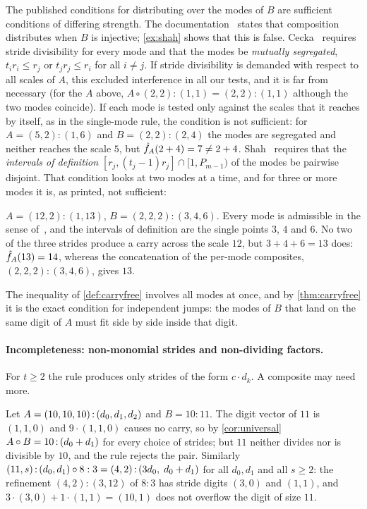 \noindent The published conditions for distributing over the modes of $B$ are sufficient
conditions of differing strength. The documentation~\cite{cutedocs} states that composition
distributes when $B$ is injective; \cref{ex:shah} shows that this is false. Cecka~\cite{cecka2026}
requires stride divisibility for every mode and that the modes be \emph{mutually segregated},
$t_ir_i\le r_j$ or $t_jr_j\le r_i$ for all $i\neq j$. If stride divisibility is demanded with
respect to all scales of $A$, this excluded interference in all our tests, and it is far from
necessary (for the $A$ above, $A\circ(2,2):(1,1)=(2,2):(1,1)$ although the two modes coincide).
If each mode is tested only against the scales that it reaches by itself, as in the single-mode
rule, the condition is not sufficient: for $A=(5,2):(1,6)$ and $B=(2,2):(2,4)$ the modes are
segregated and neither reaches the scale $5$, but $\hat{f}_{A}(2+4)=7\neq2+4$.
Shah~\cite[Def.~2.17, Thm.~2.18]{shah2024} requires that the \emph{intervals of definition}
$[r_j,(t_j-1)r_j]\cap[1,P_{m-1})$ of the modes be pairwise disjoint. That condition looks at two
modes at a time, and for three or more modes it is, as printed, not sufficient:

\begin{example}\label{ex:three}
$A=(12,2):(1,13)$, $B=(2,2,2):(3,4,6)$. Every mode is admissible in the sense
of~\cite{shah2024}, and the intervals of definition are the single points $3$, $4$ and $6$. No
two of the three strides produce a carry across the scale $12$, but $3+4+6=13$ does:
$\hat{f}_{A}(13)=14$, whereas the concatenation of the per-mode composites, $(2,2,2):(3,4,6)$, gives
$13$.
\end{example}

\noindent The inequality of \cref{def:carryfree} involves all modes at once, and by
\cref{thm:carryfree} it is the exact condition for independent jumps: the modes of $B$ that land
on the same digit of $A$ must fit side by side inside that digit.

\paragraph{Incompleteness: non-monomial strides and non-dividing factors.}
For $t\ge2$ the rule produces only strides of the form $c\cdot d_k$. A composite may need more.

\begin{example}\label{ex:sumstride}
Let $A=(10,10,10)\,{:}\,(d_0,d_1,d_2)$ and $B=10:11$. The digit vector of $11$ is $(1,1,0)$ and
$9\cdot(1,1,0)$ causes no carry, so by \cref{cor:universal} $A\circ B=10\,{:}\,(d_0+d_1)$ for
every choice of strides; but $11$ neither divides nor is divisible by $10$, and the rule rejects
the pair. Similarly $(11,s)\,{:}\,(d_0,d_1)\circ 8:3=(4,2)\,{:}\,(3d_0,\;d_0+d_1)$ for all
$d_0,d_1$ and all $s\ge 2$: the refinement $(4,2):(3,12)$ of $8:3$ has stride digits $(3,0)$ and
$(1,1)$, and $3\cdot(3,0)+1\cdot(1,1)=(10,1)$ does not overflow the digit of size $11$.
\end{example}

